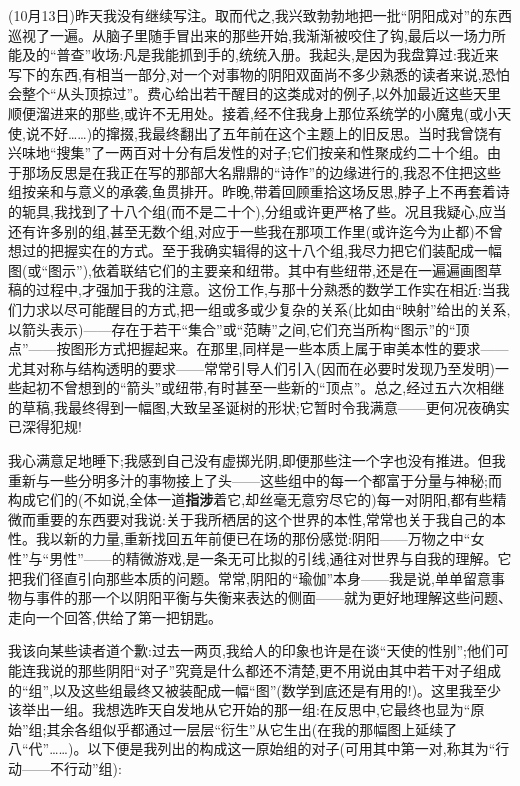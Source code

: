 (10月13日)昨天我没有继续写注。取而代之,我兴致勃勃地把一批“阴阳成对”的东西巡视了一遍。从脑子里随手冒出来的那些开始,我渐渐被咬住了钩,最后以一场力所能及的“普查”收场:凡是我能抓到手的,统统入册。我起头,是因为我盘算过:我近来写下的东西,有相当一部分,对一个对事物的阴阳双面尚不多少熟悉的读者来说,恐怕会整个“从头顶掠过”。费心给出若干醒目的这类成对的例子,以外加最近这些天里顺便溜进来的那些,或许不无用处。\dmark{}接着,经不住我身上那位系统学的小魔鬼(或小天使,说不好……)的撺掇,我最终翻出了五年前在这个主题上的旧反思。当时我曾饶有兴味地“搜集”了一两百对十分有启发性的对子;它们按亲和性聚成约二十个组。由于那场反思是在我正在写的那部大名鼎鼎的“诗作”的边缘进行的,我忍不住把这些组按亲和与意义的承袭,鱼贯排开。昨晚,带着回顾重拾这场反思,脖子上不再套着诗的轭具,我找到了十八个组(而不是二十个),分组或许更严格了些。况且我疑心,应当还有许多别的组,甚至无数个组,对应于一些我在那项工作里(或许迄今为止都)不曾想过的把握实在的方式。至于我确实辑得的这十八个组,我尽力把它们装配成一幅图(或“图示”),依着联结它们的主要亲和纽带。其中有些纽带,还是在一遍遍画图草稿的过程中,才强加于我的注意。这份工作,与那十分熟悉的数学工作实在相近:当我们力求以尽可能醒目的方式,把一组或多或少复杂的关系(比如由“映射”给出的关系,以箭头表示)——存在于若干“集合”或“范畴”之间,它们充当所构“图示”的“顶点”——按图形方式把握起来。在那里,同样是一些本质上属于审美本性的要求——尤其对称与结构透明的要求——常常引导人们引入(因而在必要时发现乃至发明)一些起初不曾想到的“箭头”或纽带,有时甚至一些新的“顶点”。总之,经过五六次相继的草稿,我最终得到一幅图,大致呈圣诞树的形状;它暂时令我满意——更何况夜确实已深得犯规!

我心满意足地睡下;我感到自己没有虚掷光阴,即便那些注一个字也没有推进。但我重新与一些分明多汁的事物接上了头\dmark{}——这些组中的每一个都富于分量与神秘;而构成它们的(不如说,全体一道\textbf{指涉}着它,却丝毫无意穷尽它的)每一对阴阳,都有些精微而重要的东西要对我说:关于我所栖居的这个世界的本性,常常也关于我自己的本性。我以新的力量,重新找回五年前便已在场的那份感觉:阴阳——万物之中“女性”与“男性”——的精微游戏,是一条无可比拟的引线,通往对世界与自我的理解。它把我们径直引向那些本质的问题。常常,阴阳的“瑜伽”本身——我是说,单单留意事物与事件的那一个以阴阳平衡与失衡来表达的侧面——就为更好地理解这些问题、走向一个回答,供给了第一把钥匙。

我该向某些读者道个歉:过去一两页,我给人的印象也许是在谈“天使的性别”;他们可能连我说的那些阴阳“对子”究竟是什么都还不清楚,更不用说由其中若干对子组成的“组”,以及这些组最终又被装配成一幅“图”(数学到底还是有用的!)。这里我至少该举出一组。我想选昨天自发地从它开始的那一组:在反思中,它最终也显为“原始”组;其余各组似乎都通过一层层“衍生”从它生出(在我的那幅图上延续了八“代”……)。以下便是我列出的构成这一原始组的对子(可用其中第一对,称其为“行动——不行动”组):

